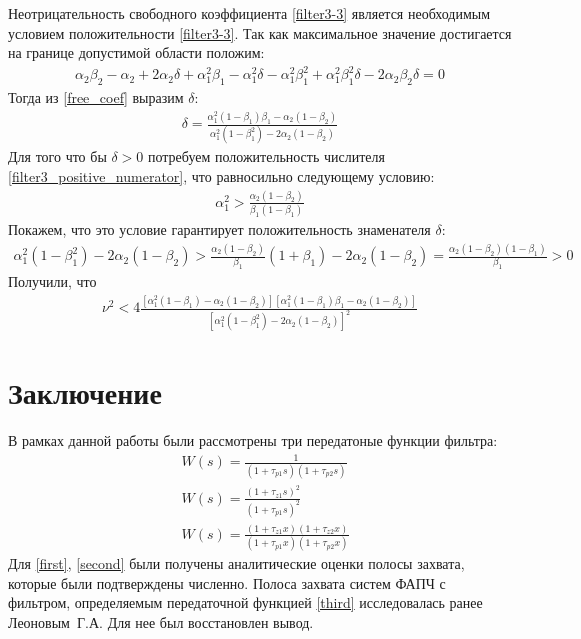 \documentclass[a4paper,14pt]{article} %
\theoremstyle{cited}
\begin{document}
Неотрицательность свободного коэффициента \eqref{filter3-3} является необходимым условием положительности \eqref{filter3-3}. Так как максимальное значение достигается на границе допустимой области положим:
 \begin{equation}\label{free_coef}
 \begin{aligned}
\alpha_2\beta_2 - \alpha_2 + 2\alpha_2\delta + \alpha_1^2\beta_1 - \alpha_1^2\delta - \alpha_1^2\beta_1^2 + \alpha_1^2\beta_1^2\delta - 2\alpha_2\beta_2\delta = 0
 \end{aligned}
\end{equation}
Тогда из \eqref{free_coef} выразим $\delta$:
 \begin{equation}\label{filter3_positive_numerator}
 \begin{aligned}
\delta = \frac{\alpha_1^2(1-\beta_1)\beta_1 - \alpha_2(1-\beta_2)}{\alpha_1^2(1-\beta_1^2) - 2\alpha_2(1-\beta_2)}
 \end{aligned}
 \end{equation}
Для того что бы $\delta > 0$ потребуем положительность числителя \eqref{filter3_positive_numerator}, что равносильно следующему условию:
 \begin{equation}
 \begin{aligned}
\alpha_1^2 > \frac{\alpha_2(1-\beta_2)}{\beta_1(1-\beta_1)}
 \end{aligned}
 \end{equation}
Покажем, что это условие гарантирует положительность знаменателя $\delta$:
 \begin{equation}
 \begin{aligned}
\alpha_1^2(1-\beta_1^2) - 2\alpha_2(1-\beta_2) > \frac{\alpha_2(1-\beta_2)}{\beta_1}(1+\beta_1) - 2\alpha_2(1-\beta_2)= \frac{\alpha_2(1-\beta_2)(1 - \beta_1)}{\beta_1} > 0
 \end{aligned}
 \end{equation}
Получили, что
 \begin{equation}
 \begin{aligned}
\nu^2 < 4\frac{[\alpha_1^2(1-\beta_1) - \alpha_2(1-\beta_2)][\alpha_1^2(1-\beta_1)\beta_1 - \alpha_2(1-\beta_2)]}{[\alpha_1^2(1-\beta_1^2) - 2\alpha_2(1-\beta_2)]^2}
 \end{aligned}
 \end{equation}
 
\pagebreak
\section{Заключение}
В рамках данной работы были рассмотрены три передатоные функции фильтра: 
 \begin{align}
&W(s) = \frac{1}{(1+\tau_{p1}s)(1+\tau_{p2}s)}\label{first}\\[5pt]
&W(s) = \frac{(1+\tau_{z1}s)^2}{(1+\tau_{p1}s)^2}\label{second}\\[5pt]
&W(s) = \frac{(1+\tau_{z1}x)(1+\tau_{z2}x)}{(1+\tau_{p1}x)(1+\tau_{p2}x)}\label{third}
 \end{align}
 Для \eqref{first}, \eqref{second} были получены аналитические оценки полосы захвата, которые были подтверждены численно. Полоса захвата систем ФАПЧ с фильтром, определяемым передаточной функцией \eqref{third} исследовалась ранее Леоновым~Г.\:А. Для нее был восстановлен вывод. 
 
\end{document}
